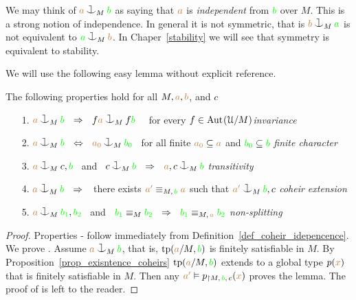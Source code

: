 We may think of ${\mr a}\cnonfork_M{\gr b}$ as saying that 
${\color{brown} a}$ is \emph{independent\/} from ${\color{green} b}$ over $M$.
This is a strong notion of independence.
In general it is not symmetric, that is ${\mr b}\cnonfork_M{\gr a}$ is not equivalent to ${\gr a}\cnonfork_M{\mr b}$. In Chaper~\ref{stability} we will see that symmetry is equivalent to stability.

We will use the following easy lemma without explicit reference.

\begin{lemma}\label{lem_coheir_independence}
  The following properties hold for all $M,{\color{brown} a},{\color{brown} b}$, and $c$
  \begin{itemize}
  \item[1.] ${\mr a}\cnonfork_M{\gr b}\ \ \IMP\ \ f{\mr a}\cnonfork_Mf{\gr b}$ \ \ 
            for every $f\in{\rm Aut\kern.15ex}(\EuScript U/M)$\hfill \textit{invariance}
  \item[2.] ${\mr a}\cnonfork_M{\gr b}\ \ \IFF\ \ {\mr a_0}\cnonfork_M{\gr b_0}$
            \ for all finite ${\color{brown} a_0}\subseteq{\color{brown}a}$ and 
            ${\color{green} b_0}\subseteq{\color{green}b}$ \hfill\textit{finite character}
  \item[3.] ${\mr a}\cnonfork_Mc,{\gr b}$ \ and \ 
            $c\cnonfork_M{\gr b}\ \ \IMP\ \ {\mr a},c\cnonfork_M{\gr b}$
            \hfill\hfill\hfill\textit{transitivity}
  \item[4.] ${\mr a}\cnonfork_M{\gr b}\ \ \IMP\ \ $ 
            there exists ${\color{brown} a'}\equiv_{M,\,{\color{green} b}}{\color{brown} a}$ such that 
            ${\mr a'}\cnonfork_M{\gr b},c$
            \textit{coheir extension}
  \item[5.] ${\mr a}\cnonfork_M{\gr b_1},{\gr b_2}$ \ and \ 
  ${\color{green} b_1}\equiv_M{\color{green} b_2}\ \ \Rightarrow\ \ {\color{green} b_1}\equiv_{M,\,{\color{brown} a}}{\color{green} b_2}$
            \hspace{\stretch{20}}\textit{non-splitting}
  \end{itemize}
\end{lemma}
\begin{proof}
  Properties - follow immediately from Definition~\ref{def_coheir_idepencence}.
  We prove .
  Assume ${\mr a}\cnonfork_M{\gr b}$, that is, ${\rm tp}({\color{brown} a}/M,{\color{green} b})$ is finitely satisfiable in $M$.
  By Proposition~\ref{prop_exisntence_coheirs} ${\rm tp}({\color{brown} a}/M,{\color{green} b})$ extends to a global type $p({\color{brown} x})$ that is finitely satisfiable in $M$.
  Then any ${\color{brown} a'}\vDash p_{\restriction M,\,{\color{green} b},\,c}({\color{brown} x})$ proves the lemma.
  The proof of \ssf{5} is left to the reader.
\end{proof}

